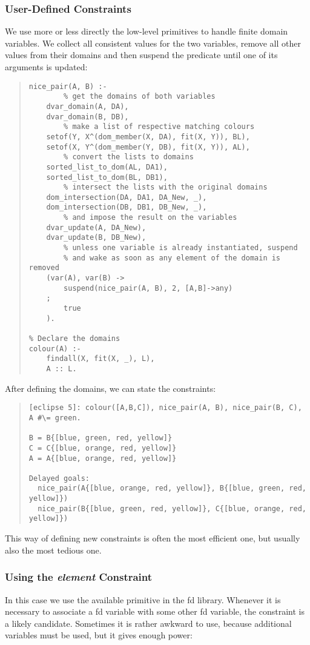 \subsubsection{User-Defined Constraints}
We use more or less directly the low-level primitives to handle
finite domain variables.
We collect all consistent values for the two variables, remove
all other values from their domains and then suspend
the predicate until one of its arguments is updated:
\begin{quote}
\begin{verbatim}
nice_pair(A, B) :-
        % get the domains of both variables
    dvar_domain(A, DA),         
    dvar_domain(B, DB),         
        % make a list of respective matching colours
    setof(Y, X^(dom_member(X, DA), fit(X, Y)), BL),
    setof(X, Y^(dom_member(Y, DB), fit(X, Y)), AL),
        % convert the lists to domains
    sorted_list_to_dom(AL, DA1),
    sorted_list_to_dom(BL, DB1),
        % intersect the lists with the original domains
    dom_intersection(DA, DA1, DA_New, _),
    dom_intersection(DB, DB1, DB_New, _),
        % and impose the result on the variables
    dvar_update(A, DA_New),
    dvar_update(B, DB_New),
        % unless one variable is already instantiated, suspend
        % and wake as soon as any element of the domain is removed
    (var(A), var(B) ->
        suspend(nice_pair(A, B), 2, [A,B]->any)
    ;
        true
    ).

% Declare the domains
colour(A) :-
    findall(X, fit(X, _), L),
    A :: L.
\end{verbatim}
\end{quote}

After defining the domains, we can state the constraints:
\begin{quote}
\begin{verbatim}
[eclipse 5]: colour([A,B,C]), nice_pair(A, B), nice_pair(B, C), A #\= green.

B = B{[blue, green, red, yellow]}
C = C{[blue, orange, red, yellow]}
A = A{[blue, orange, red, yellow]}
 
Delayed goals:
  nice_pair(A{[blue, orange, red, yellow]}, B{[blue, green, red, yellow]})
  nice_pair(B{[blue, green, red, yellow]}, C{[blue, orange, red, yellow]})
\end{verbatim}
\end{quote}

This way of defining new constraints is often the most efficient
one, but usually also the most tedious one.


\subsubsection{Using the {\it element} Constraint}
In this case we use the available primitive in the fd library. Whenever
it is necessary to associate a fd variable with some other fd variable,
the  constraint is a likely candidate. Sometimes it is
rather awkward to use, because additional variables must be used,
but it gives enough power:

